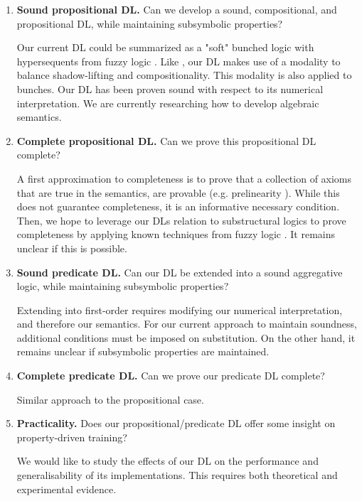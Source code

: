 \begin{enumerate}
    \item \textbf{Sound propositional DL.} Can we develop a sound, compositional, and propositional DL, while maintaining subsymbolic properties? 
    
    Our current DL could be summarized as a "soft" bunched logic \citep{o1999logic} with hypersequents from fuzzy logic \citep{prooffuzzy}. Like \citeauthor{capucci2024quantifiers}, our DL makes use of a modality to balance shadow-lifting and compositionality. This modality is also applied to bunches. Our DL has been proven sound with respect to its numerical interpretation. We are currently researching how to develop algebraic semantics.
    
    \item \textbf{Complete propositional DL.} Can we prove this propositional DL complete?
    
    A first approximation to completeness is to prove that a collection of axioms that are true in the semantics, are provable (e.g. prelinearity \citep{prooffuzzy}). While this does not guarantee completeness, it is an informative necessary condition. Then, we hope to leverage our DLs relation to substructural logics to prove completeness by applying known techniques from fuzzy logic \citep{cintula2011handbook, galatos2007residuated}. It remains unclear if this is possible. 
    \item \textbf{Sound predicate DL.} Can our DL be extended into a sound aggregative logic, while maintaining subsymbolic properties?

    Extending into first-order requires modifying our numerical interpretation, and therefore our semantics. For our current approach to maintain soundness, additional conditions must be imposed on substitution. On the other hand, it remains unclear if subsymbolic properties are maintained. 
    
    \item \textbf{Complete predicate DL.} Can we prove our predicate DL complete?
    
    Similar approach to the propositional case. 
    
    \item \textbf{Practicality.} Does our propositional/predicate DL offer some insight on property-driven training?

    We would like to study the effects of our DL on the performance and generalisability \citep{jakubovitz2019generalization} of its implementations. This requires both theoretical and experimental evidence. 
    
\end{enumerate}
